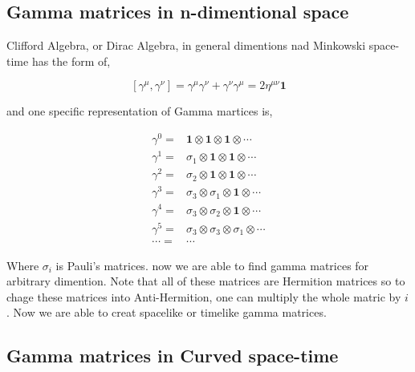 
\subsection{Gamma matrices in n-dimentional space}

Clifford Algebra, or Dirac Algebra, in general dimentions nad Minkowski space-time has the form of,

\begin{equation}
   \left[\gamma^{\mu},\gamma^{\nu}\right] = \gamma^{\mu}\gamma^{\nu} + \gamma^{\nu}\gamma^{\mu} = 2\eta^{\mu\nu}\mathbf{1}
\end{equation}

and one specific representation of Gamma martices is,

\begin{align}
   \gamma^{0} =& \mathbf{1}\otimes\mathbf{1}\otimes\mathbf{1}\otimes\cdots \nonumber\\
   \gamma^{1} =& \sigma_1\otimes\mathbf{1}\otimes\mathbf{1}\otimes\cdots \nonumber\\
   \gamma^{2} =& \sigma_2\otimes\mathbf{1}\otimes\mathbf{1}\otimes\cdots \nonumber\\
   \gamma^{3} =& \sigma_3\otimes\sigma_1\otimes\mathbf{1}\otimes\cdots   \nonumber\\
   \gamma^{4} =& \sigma_3\otimes\sigma_2\otimes\mathbf{1}\otimes\cdots   \nonumber\\
   \gamma^{5} =& \sigma_3\otimes\sigma_3\otimes\sigma_1\otimes\cdots     \nonumber\\
   \cdots     =& \cdots
\end{align}

Where $\sigma_i$ is Pauli's matrices. now we are able to find gamma matrices for arbitrary dimention. Note that all of these matrices are Hermition matrices so to chage these matrices into Anti-Hermition, one can multiply the whole matric by $i$. Now we are able to creat spacelike or timelike gamma matrices.

\subsection{Gamma matrices in Curved space-time}

